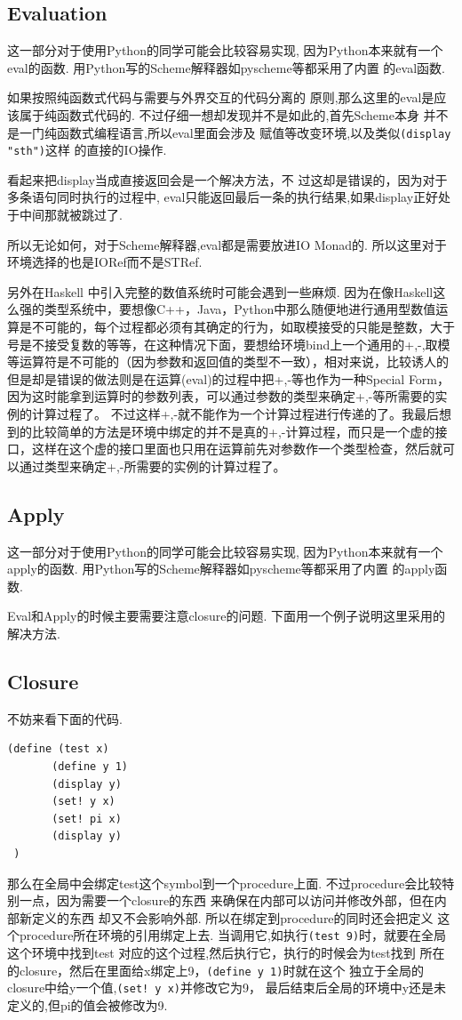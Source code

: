\documentclass[11pt]{article}
\theoremstyle{definition}
\theoremstyle{remark}
\numberwithin{equation}{section}
\begin{document}
\subsection{Evaluation}
这一部分对于使用Python的同学可能会比较容易实现,
因为Python本来就有一个eval的函数.
用Python写的Scheme解释器如pyscheme等都采用了内置
的eval函数.

如果按照纯函数式代码与需要与外界交互的代码分离的
原则,那么这里的eval是应该属于纯函数式代码的.
不过仔细一想却发现并不是如此的,首先Scheme本身
并不是一门纯函数式编程语言,所以eval里面会涉及
赋值等改变环境,以及类似\verb|(display "sth")|这样
的直接的IO操作.

看起来把display当成直接返回会是一个解决方法，不
过这却是错误的，因为对于多条语句同时执行的过程中,
eval只能返回最后一条的执行结果,如果display正好处
于中间那就被跳过了.

所以无论如何，对于Scheme解释器,eval都是需要放进IO Monad的.
所以这里对于环境选择的也是IORef而不是STRef.

另外在Haskell 中引入完整的数值系统时可能会遇到一些麻烦.
因为在像Haskell这么强的类型系统中，要想像C++，Java，Python中那么随便地进行通用型数值运算是不可能的，每个过程都必须有其确定的行为，如取模接受的只能是整数，大于号是不接受复数的等等，在这种情况下面，要想给环境bind上一个通用的+,-,取模等运算符是不可能的（因为参数和返回值的类型不一致），相对来说，比较诱人的但是却是错误的做法则是在运算(eval)的过程中把+,-等也作为一种Special Form，因为这时能拿到运算时的参数列表，可以通过参数的类型来确定+,-等所需要的实例的计算过程了。
不过这样+,-就不能作为一个计算过程进行传递的了。我最后想到的比较简单的方法是环境中绑定的并不是真的+,-计算过程，而只是一个虚的接口，这样在这个虚的接口里面也只用在运算前先对参数作一个类型检查，然后就可以通过类型来确定+,-所需要的实例的计算过程了。
\subsection{Apply}
这一部分对于使用Python的同学可能会比较容易实现,
因为Python本来就有一个apply的函数.
用Python写的Scheme解释器如pyscheme等都采用了内置
的apply函数.

Eval和Apply的时候主要需要注意closure的问题.
下面用一个例子说明这里采用的解决方法.
\subsection{Closure}
不妨来看下面的代码.
\begin{verbatim}
(define (test x)
       (define y 1)
       (display y)
       (set! y x)
       (set! pi x)
       (display y)
 )
\end{verbatim}
 那么在全局中会绑定test这个symbol到一个procedure上面.
 不过procedure会比较特别一点，因为需要一个closure的东西
 来确保在内部可以访问并修改外部，但在内部新定义的东西
 却又不会影响外部. 所以在绑定到procedure的同时还会把定义
 这个procedure所在环境的引用绑定上去.
 当调用它,如执行\verb|(test 9)|时，就要在全局这个环境中找到test
 对应的这个过程,然后执行它，执行的时候会为test找到
 所在的closure，然后在里面给x绑定上9，\verb|(define y 1)|时就在这个
 独立于全局的closure中给y一个值,\verb|(set! y x)|并修改它为9，
 最后结束后全局的环境中y还是未定义的,但pi的值会被修改为9.
\end{document}

